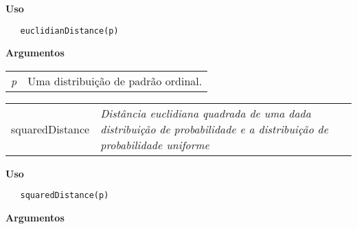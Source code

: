 \documentclass[12pt,letterpaper]{article}
\begin{document}
\vspace{-0.5cm}

\hrulefill  

\vspace{0.5cm}

\textbf{Uso}

\begin{lstlisting}
   euclidianDistance(p)
\end{lstlisting}

\vspace{0.5cm}

\textbf{Argumentos}

\begin{table}[!h]
\begin{center}
\begin{tabularx}{\textwidth}{X X}
\hspace{0.5cm} \textit{p} & Uma distribuição de padrão ordinal.\\
\end{tabularx}
\end{center}
\end{table} 


\hrulefill   

\begin{table}[!h]
\begin{center}
\begin{tabularx}{\textwidth}{ X X}
\hspace{0.5cm} squaredDistance & \textit{Distância euclidiana quadrada de uma dada distribuição de probabilidade e a distribuição de probabilidade uniforme}\\
\end{tabularx}
\end{center}
\end{table} 

\vspace{-0.5cm}

\hrulefill  

\vspace{0.5cm}

\textbf{Uso}

\begin{lstlisting}
   squaredDistance(p)
\end{lstlisting}

\vspace{0.5cm}

\textbf{Argumentos}
\end{document}
